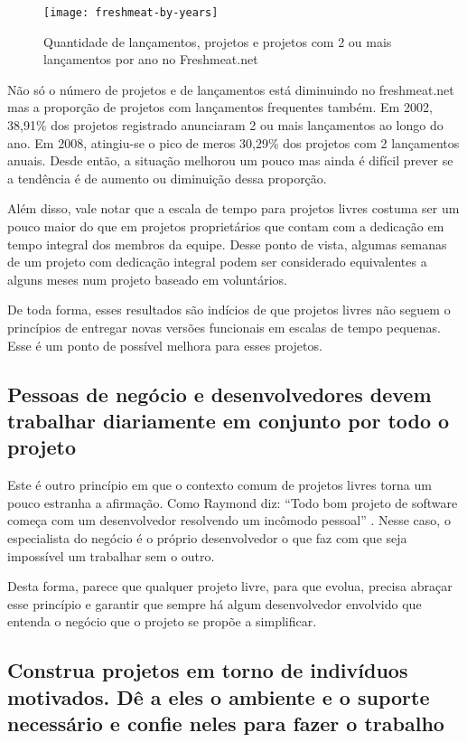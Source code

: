 \begin{figure}
  \centering
  \texttt{[image: freshmeat-by-years]}
  \caption{Quantidade de lançamentos, projetos e projetos com 2 ou
    mais lançamentos por ano no Freshmeat.net}
  \label{fig:freshmeat-by-years}
\end{figure}

Não só o número de projetos e de lançamentos está diminuindo no
freshmeat.net mas a proporção de projetos com lançamentos
frequentes também. Em 2002, 38,91\% dos projetos registrado
anunciaram 2 ou mais lançamentos ao longo do ano. Em 2008, atingiu-se
o pico de meros 30,29\% dos projetos com 2 lançamentos anuais. Desde
então, a situação melhorou um pouco mas ainda é difícil prever se a
tendência é de aumento ou diminuição dessa proporção.

Além disso, vale notar que a escala de tempo para projetos livres
costuma ser um pouco maior do que em projetos proprietários que contam
com a dedicação em tempo integral dos membros da equipe. Desse ponto
de vista, algumas semanas de um projeto com dedicação integral podem
ser considerado equivalentes a alguns meses num projeto baseado em
voluntários.

De toda forma, esses resultados são indícios de que projetos livres
não seguem o princípios de entregar novas versões funcionais em
escalas de tempo pequenas. Esse é um ponto de possível melhora para
esses projetos.

\subsection[Trabalhar com pessoas de negócio]{Pessoas de negócio e
  desenvolvedores devem trabalhar diariamente em conjunto por todo o
  projeto}

Este é outro princípio em que o contexto comum de projetos livres
torna um pouco estranha a afirmação. Como Raymond diz: ``Todo bom
projeto de software começa com um desenvolvedor resolvendo um incômodo
pessoal'' \cite{Raymond1999}. Nesse caso, o especialista do negócio é
o próprio desenvolvedor o que faz com que seja impossível um trabalhar
sem o outro.

Desta forma, parece que qualquer projeto livre, para que evolua,
precisa abraçar esse princípio e garantir que sempre há algum
desenvolvedor envolvido que entenda o negócio que o projeto se propõe
a simplificar.

\subsection[Trabalhe com indivíduos motivados]{ Construa projetos em
  torno de indivíduos motivados.  Dê a eles o ambiente e o suporte
  necessário e confie neles para fazer o trabalho}

